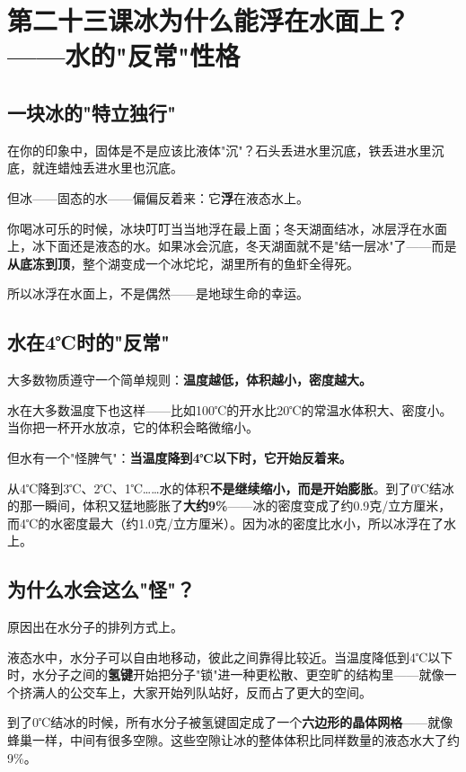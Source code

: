 \documentclass[a4paper,12pt]{ctexart}
\begin{document}
\section{\textcolor{orange!80!black}{第二十三课\quad 冰为什么能浮在水面上？——水的"反常"性格}}

\subsection*{一块冰的"特立独行"}

在你的印象中，固体是不是应该比液体"沉"？石头丢进水里沉底，铁丢进水里沉底，就连蜡烛丢进水里也沉底。

但冰——固态的水——偏偏反着来：它\textbf{浮}在液态水上。

你喝冰可乐的时候，冰块叮叮当当地浮在最上面；冬天湖面结冰，冰层浮在水面上，冰下面还是液态的水。如果冰会沉底，冬天湖面就不是"结一层冰"了——而是\textbf{从底冻到顶}，整个湖变成一个冰坨坨，湖里所有的鱼虾全得死。

所以冰浮在水面上，不是偶然——是地球生命的幸运。

\subsection*{水在4℃时的"反常"}

大多数物质遵守一个简单规则：\textbf{温度越低，体积越小，密度越大。}

水在大多数温度下也这样——比如100℃的开水比20℃的常温水体积大、密度小。当你把一杯开水放凉，它的体积会略微缩小。

但水有一个"怪脾气"：\textbf{当温度降到4℃以下时，它开始反着来。}

从4℃降到3℃、2℃、1℃……水的体积\textbf{不是继续缩小，而是开始膨胀}。到了0℃结冰的那一瞬间，体积又猛地膨胀了\textbf{大约9\%}——冰的密度变成了约0.9克/立方厘米，而4℃的水密度最大（约1.0克/立方厘米）。因为冰的密度比水小，所以冰浮在了水上。

\subsection*{为什么水会这么"怪"？}

原因出在水分子的排列方式上。

液态水中，水分子可以自由地移动，彼此之间靠得比较近。当温度降低到4℃以下时，水分子之间的\textbf{氢键}开始把分子"锁"进一种更松散、更空旷的结构里——就像一个挤满人的公交车上，大家开始列队站好，反而占了更大的空间。

到了0℃结冰的时候，所有水分子被氢键固定成了一个\textbf{六边形的晶体网格}——就像蜂巢一样，中间有很多空隙。这些空隙让冰的整体体积比同样数量的液态水大了约9\%。
\end{document}

